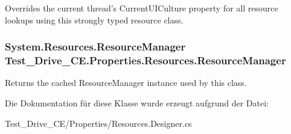 Overrides the current thread's CurrentUICulture property for all resource lookups using this strongly typed resource class. 

\hypertarget{class_test___drive___c_e_1_1_properties_1_1_resources_a97da4c165bc96ab20ba9775fd55be717}{
\subsubsection[{ResourceManager}]{\setlength{\rightskip}{0pt plus 5cm}System.Resources.ResourceManager Test\_\-Drive\_\-CE.Properties.Resources.ResourceManager}}
\label{class_test___drive___c_e_1_1_properties_1_1_resources_a97da4c165bc96ab20ba9775fd55be717}


Returns the cached ResourceManager instance used by this class. 



Die Dokumentation für diese Klasse wurde erzeugt aufgrund der Datei:\begin{DoxyCompactItemize}
\item 
Test\_\-Drive\_\-CE/Properties/Resources.Designer.cs\end{DoxyCompactItemize}
